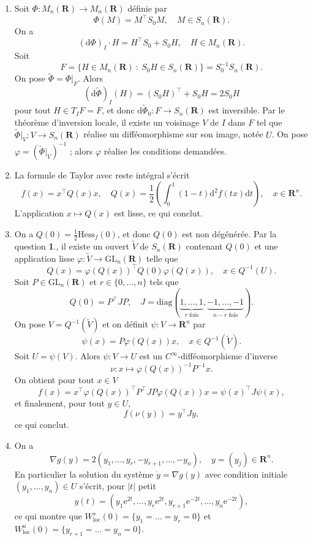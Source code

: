 \documentclass[a4paper,12pt,openany]{article}
\theoremstyle{plain}
\theoremstyle{definition}
\newcommand{\e}{\mathrm{e}}
\newcommand{\dd}{\mathrm{d}}
\newcommand{\R}{\mathbf{R}}
\begin{document}
\begin{enumerate}

\item Soit $\Phi : M_n(\R) \to M_n(\R)$ d\'efinie par
$$
\Phi(M) = M^\top S_0 M, \quad M \in S_n(\R).
$$
On a
$$
(\dd \Phi)_I \cdot H = H^\top S_0 + S_0 H, \quad H \in M_n(\R).
$$
Soit 
$$F = \{H \in M_n(\R)~:~S_0H \in S_n(\R)\} = S_0^{-1} S_n(\R).$$
On pose $\tilde \Phi = \Phi|_F$. Alors
$$(\dd\tilde\Phi)_I(H) = (S_0H)^\top + S_0H = 2 S_0 H$$
pour tout $H \in T_IF = F$, et donc $\dd \tilde \Phi_0 : F \to S_n(\R)$ est inversible. Par le th\'eor\`eme d'inversion locale, il existe un voisinage $V$ de $I$ dans $F$ tel que $\tilde \Phi|_V : V \to S_n(\R)$ r\'ealise un diff\'eomorphisme sur son image, not\'ee $U$. On pose $\varphi = (\tilde \Phi|_V)^{-1}$ ; alors $\varphi$ r\'ealise les conditions demand\'ees.

\item La formule de Taylor avec reste int\'egral s'\'ecrit
$$
f(x) =  x^\top Q(x) x, \quad Q(x) = \frac{1}{2}\left(\int_0^1(1-t)\dd^2f(tx) \dd t\right), \quad x \in \R^n.
$$
L'application $x \mapsto Q(x)$ est lisse, ce qui conclut.
\item On a $Q(0) = \frac{1}{2} \mathrm{Hess}_f(0)$, et donc $Q(0)$ est non d\'eg\'en\'er\'ee. Par la question \textbf{1}., il existe un ouvert $\tilde V$ de $S_n(\R)$ contenant $Q(0)$ et une application lisse $\varphi : \tilde V \to \mathrm{GL}_n(\R)$ telle que
$$
Q(x) = \varphi(Q(x))^\top Q(0) \varphi(Q(x)), \quad x \in Q^{-1}(U).
$$
Soit $P \in \mathrm{GL}_n(\R)$ et $r \in \{0, \dots, n\}$ tels que
$$
Q(0) = P^\top J P, \quad J = \mathrm{diag}(\underset{r \text{ fois}}{\underbrace{1, \dots, 1}}, \underset{n-r \text{ fois}}{\underbrace{-1, \dots, -1}}).
$$
On pose $V = Q^{-1}(\tilde V)$ et on d\'efinit  $\psi : V \to \R^n$ par 
$$
\psi(x) = P\varphi(Q(x))x, \quad x \in Q^{-1}(\tilde V).
$$
Soit $U = \psi(V)$. Alors $\psi : V \to U$ est un $C^\infty$-diff\'eomorphisme d'inverse
$$
\nu : x \mapsto \varphi(Q(x))^{-1}P^{-1} x.
$$
On obtient pour tout $x \in V$
$$
f(x) = x^\top \varphi(Q(x))^\top P^\top J P \varphi(Q(x)) x = \psi(x)^\top J \psi(x),
$$
et finalement, pour tout $y \in U$,
$$
f(\nu(y)) = y^\top J y,
$$
ce qui conclut.
\item On a 
$$
\nabla g(y) = 2 (y_1, \dots, y_r, -y_{r+1}, \dots, -y_n), \quad y = (y_j) \in \R^n.
$$
En particulier la solution du syst\`eme $\dot y = \nabla g(y)$ avec condition initiale $(y_1, \dots, y_n) \in U$ s'\'ecrit, pour $|t|$ petit
$$
y(t) = (y_1\e^{2t}, \dots, y_r\e^{2t}, y_{r+1} \e^{-2t}, \dots, y_n\e^{-2t}),
$$
ce qui montre que $W^s_\mathrm{loc}(0) = \{y_1 = \dots = y_r = 0\}$ et $W^u_\mathrm{loc}(0) = \{y_{r+1} = \dots = y_n = 0\}$.
\end{enumerate}
\end{document}
